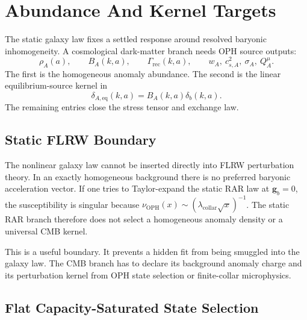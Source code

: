\documentclass[11pt]{article}
\newcommand{\OPH}{\mathrm{OPH}}
\newcommand{\lambdac}{\lambda_{\mathrm{collar}}}
\begin{document}
\section{Abundance And Kernel Targets}

The static galaxy law fixes a settled response around resolved baryonic
inhomogeneity.  A cosmological dark-matter branch needs OPH source outputs:
\begin{equation}
  \rho_A(a),
  \qquad
  B_A(k,a),
  \qquad
  \Gamma_{\mathrm{rec}}(k,a),
  \qquad
  w_A,\ c_{s,A}^2,\ \sigma_A,\ Q_A^\mu .
\end{equation}
The first is the homogeneous anomaly abundance.  The second is the linear
equilibrium-source kernel in
\begin{equation}
  \delta_{A,\mathrm{eq}}(k,a)=B_A(k,a)\delta_b(k,a).
\end{equation}
The remaining entries close the stress tensor and exchange law.

\subsection{Static FLRW Boundary}

The nonlinear galaxy law cannot be inserted directly into FLRW perturbation
theory.  In an exactly homogeneous background there is no preferred baryonic
acceleration vector.  If one tries to Taylor-expand the static RAR law at
\(\mathbf g_b=0\), the susceptibility is singular because
\(\nu_{\OPH}(x)\sim(\lambdac\sqrt{x})^{-1}\).  The static RAR branch therefore
does not select a homogeneous anomaly density or a universal CMB kernel.

This is a useful boundary.  It prevents a hidden fit from being smuggled into
the galaxy law.  The CMB branch has to declare its background anomaly charge
and its perturbation kernel from OPH state selection or finite-collar
microphysics.

\subsection{Flat Capacity-Saturated State Selection}
\end{document}
